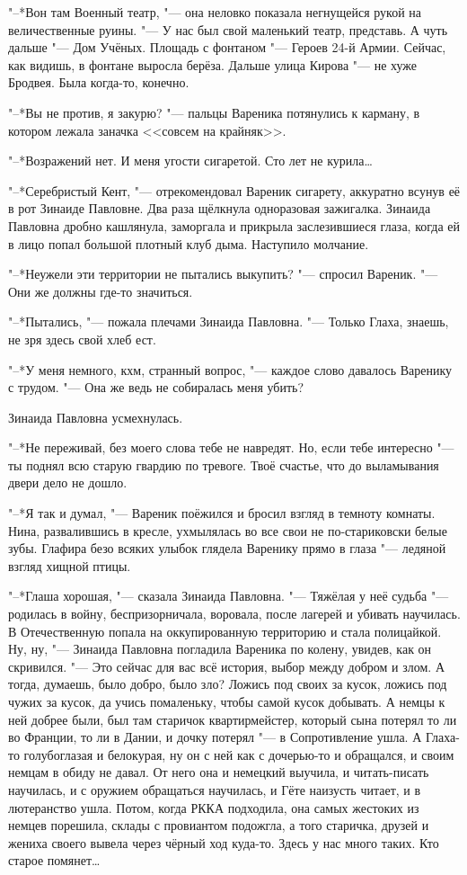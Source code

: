 "--*Вон там Военный театр, "--- она неловко показала негнущейся рукой на величественные руины.
"--- У нас был свой маленький театр, представь.
А чуть дальше "--- Дом Учёных.
Площадь с фонтаном "--- Героев 24-й Армии.
Сейчас, как видишь, в фонтане выросла берёза.
Дальше улица Кирова "--- не хуже Бродвея.
Была когда-то, конечно.

"--*Вы не против, я закурю? "--- пальцы Вареника потянулись к карману, в котором лежала заначка <<совсем на крайняк>>.

"--*Возражений нет.
И меня угости сигаретой.
Сто лет не курила\ldots{}

"--*Серебристый Кент, "--- отрекомендовал Вареник сигарету, аккуратно всунув её в рот Зинаиде Павловне.
Два раза щёлкнула одноразовая зажигалка.
Зинаида Павловна дробно кашлянула, заморгала и прикрыла заслезившиеся глаза, когда ей в лицо попал большой плотный клуб дыма.
Наступило молчание.

"--*Неужели эти территории не пытались выкупить? "--- спросил Вареник.
"--- Они же должны где-то значиться.

"--*Пытались, "--- пожала плечами Зинаида Павловна.
"--- Только Глаха, знаешь, не зря здесь свой хлеб ест.

"--*У меня немного, кхм, странный вопрос, "--- каждое слово давалось Варенику с трудом.
"--- Она же ведь не собиралась меня убить?

Зинаида Павловна усмехнулась.

"--*Не переживай, без моего слова тебе не навредят.
Но, если тебе интересно "--- ты поднял всю старую гвардию по тревоге.
Твоё счастье, что до выламывания двери дело не дошло.

"--*Я так и думал, "--- Вареник поёжился и бросил взгляд в темноту комнаты.
Нина, развалившись в кресле, ухмылялась во все свои не по-стариковски белые зубы.
Глафира безо всяких улыбок глядела Варенику прямо в глаза "--- ледяной взгляд хищной птицы.

"--*Глаша хорошая, "--- сказала Зинаида Павловна.
"--- Тяжёлая у неё судьба "--- родилась в войну, беспризорничала, воровала, после лагерей и убивать научилась.
В Отечественную попала на оккупированную территорию и стала полицайкой.
Ну, ну, "--- Зинаида Павловна погладила Вареника по колену, увидев, как он скривился.
"--- Это сейчас для вас всё история, выбор между добром и злом.
А тогда, думаешь, было добро, было зло?
Ложись под своих за кусок, ложись под чужих за кусок, да учись помаленьку, чтобы самой кусок добывать.
А немцы к ней добрее были, был там старичок квартирмейстер, который сына потерял то ли во Франции, то ли в Дании, и дочку потерял "--- в Сопротивление ушла.
А Глаха-то голубоглазая и белокурая, ну он с ней как с дочерью-то и обращался, и своим немцам в обиду не давал.
От него она и немецкий выучила, и читать-писать научилась, и с оружием обращаться научилась, и Гёте наизусть читает, и в лютеранство ушла.
Потом, когда РККА подходила, она самых жестоких из немцев порешила, склады с провиантом подожгла, а того старичка, друзей и жениха своего вывела через чёрный ход куда-то.
Здесь у нас много таких.
Кто старое помянет\ldots{}

